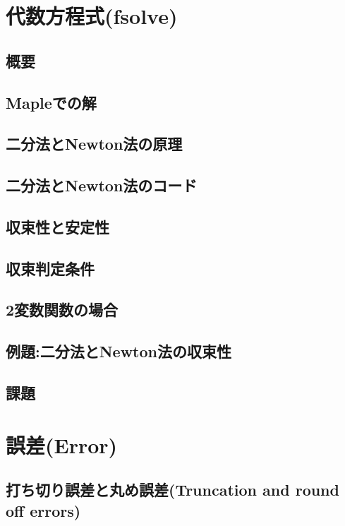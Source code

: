 \chapter{代数方程式(fsolve)}
\section{概要}
 
\section{Mapleでの解}
 
\section{二分法とNewton法の原理}
 
\section{二分法とNewton法のコード}
 
\section{収束性と安定性}
 
\section{収束判定条件}
 
\section{2変数関数の場合}
 
\section{例題:二分法とNewton法の収束性}
 
\section{課題}
 

\chapter{誤差(Error)}
\section{打ち切り誤差と丸め誤差(Truncation and round off errors)}
 
